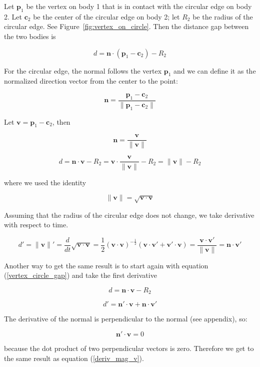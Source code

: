 \documentclass[final]{article}
\begin{document}
Let $\mathbf{p}_1$ be the vertex on body 1 that is in contact with the circular edge on
body 2. Let $\mathbf{c}_2$ be the center of the circular edge on body 2; let $R_2$ be
the radius of the circular edge. See Figure~\ref{fig:vertex_on_circle}. Then the
distance gap between the two bodies is

\[
  d = \mathbf{n} \cdot (\mathbf{p}_1 - \mathbf{c}_2) - R_2
\]

For the circular edge, the normal follows the vertex $\mathbf{p}_1$ and we can define it
as the normalized direction vector from the center to the point:

\[
  \mathbf{n} = \frac { \mathbf{p}_1 - \mathbf{c}_2 } { \|\mathbf{p}_1 - \mathbf{c}_2\| }
\]

Let $\mathbf{v} = \mathbf{p}_1 - \mathbf{c}_2$, then

\begin{equation}\label{vertex_circle_normal}
  \mathbf{n} = \frac{ \mathbf{v} } { \| \mathbf{v} \| }
\end{equation}

\begin{equation}\label{vertex_circle_gap}
  d = \mathbf{n} \cdot \mathbf{v} - R_2 = \mathbf{v} \cdot
    \frac{ \mathbf{v} } { \| \mathbf{v} \| } - R_2 = \| \mathbf{v} \| - R_2
\end{equation}

where we used the identity

\[
  \| \mathbf{v} \| = \sqrt{ \mathbf{v} \cdot \mathbf{v} }
\]

Assuming that the radius of the circular edge does not change, we take derivative with
respect to time.

\begin{equation}\label{deriv_mag_v}
  d' =  \| \mathbf{v} \| '
  = \frac{ d } { d t} \sqrt{ \mathbf{v} \cdot \mathbf{v} }
  = \frac {1}{2} (\mathbf{v} \cdot \mathbf{v}) ^{-\frac{1}{2}}
  (\mathbf{v} \cdot \mathbf{v}' + \mathbf{v}' \cdot \mathbf{v})
  = \frac{ \mathbf{v} \cdot \mathbf{v}' } { \| \mathbf{v} \| }
  = \mathbf{n} \cdot \mathbf{v}'
\end{equation}

\begin{framed}

  Another way to get the same result is to start again with equation
  (\ref{vertex_circle_gap}) and take the first derivative

  \[
    d = \mathbf{n} \cdot \mathbf{v} - R_2
  \]

  \[
    d' = \mathbf{n}' \cdot \mathbf{v} + \mathbf{n} \cdot \mathbf{v}'
  \]

  The derivative of the normal is perpendicular to the normal (see appendix), so:

  \[
    \mathbf{n}' \cdot \mathbf{v} = 0
  \]

  because the dot product of two perpendicular vectors is zero. Therefore we get to the
  same result as equation (\ref{deriv_mag_v}).

\end{framed}
\end{document}
